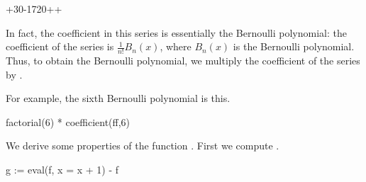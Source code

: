 {{{{{{{{{{{{{{{{\begin{xtc}
\begin{TeXOutput}
\begin{fricasmath}{5}
{{}+30\TIMES {}-{1}}{720}\TIMES {}+\TIMES {}+%
\end{fricasmath}
\end{TeXOutput}
\end{xtc}
%
In fact, the  coefficient in this series is essentially
the  Bernoulli polynomial:
the  coefficient of the series is
${\frac{1}{n!}} B_n(x)$, where
$B_n(x)$
is the  Bernoulli polynomial.
Thus, to obtain the  Bernoulli polynomial, we multiply
the  coefficient
of the series  by .
%
\begin{xtc}
\begin{xtccomment}
For example, the sixth Bernoulli polynomial is this.
\end{xtccomment}
\begin{spadsrc}
factorial(6) * coefficient(ff,6) 
\end{spadsrc}
\begin{TeXOutput}
\begin{fricasmath}{6}
%
\end{fricasmath}
\end{TeXOutput}
\end{xtc}
%
\begin{xtc}
\begin{xtccomment}
We derive some properties of the function .
First we compute .
\end{xtccomment}
\begin{spadsrc}
g := eval(f, x = x + 1) - f 
\end{spadsrc}
\begin{TeXOutput}
\begin{fricasmath}{7}
%
\end{fricasmath}
\end{TeXOutput}
\end{xtc}
}}}}}}}}}}}}}}}}
